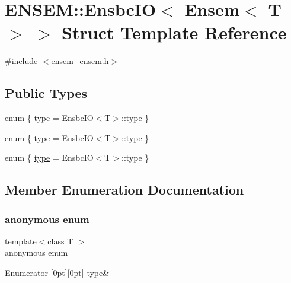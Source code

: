 \hypertarget{structENSEM_1_1EnsbcIO_3_01Ensem_3_01T_01_4_01_4}{}\section{E\+N\+S\+EM\+:\+:Ensbc\+IO$<$ Ensem$<$ T $>$ $>$ Struct Template Reference}
\label{structENSEM_1_1EnsbcIO_3_01Ensem_3_01T_01_4_01_4}


{\ttfamily \#include $<$ensem\+\_\+ensem.\+h$>$}

\subsection*{Public Types}
\begin{DoxyCompactItemize}
\item 
enum \{ \mbox{\hyperlink{structENSEM_1_1EnsbcIO_3_01Ensem_3_01T_01_4_01_4_a96e5c0cdf35d9f2fb39b4c54522912a7a69aac019e5c8434d1fa6bc1587dfec89}{type}} = Ensbc\+IO$<$T$>$\+:\+:type
 \}
\item 
enum \{ \mbox{\hyperlink{structENSEM_1_1EnsbcIO_3_01Ensem_3_01T_01_4_01_4_a96e5c0cdf35d9f2fb39b4c54522912a7a69aac019e5c8434d1fa6bc1587dfec89}{type}} = Ensbc\+IO$<$T$>$\+:\+:type
 \}
\item 
enum \{ \mbox{\hyperlink{structENSEM_1_1EnsbcIO_3_01Ensem_3_01T_01_4_01_4_a96e5c0cdf35d9f2fb39b4c54522912a7a69aac019e5c8434d1fa6bc1587dfec89}{type}} = Ensbc\+IO$<$T$>$\+:\+:type
 \}
\end{DoxyCompactItemize}


\subsection{Member Enumeration Documentation}
\mbox{\label{structENSEM_1_1EnsbcIO_3_01Ensem_3_01T_01_4_01_4_adf14e7314773c56b138fb1ba417a9696}} 
\subsubsection{\texorpdfstring{anonymous enum}{anonymous enum}}
{\footnotesize\ttfamily template$<$class T $>$ \\
anonymous enum}

\begin{DoxyEnumFields}{Enumerator}
[0pt][0pt]{}\mbox{\label{structENSEM_1_1EnsbcIO_3_01Ensem_3_01T_01_4_01_4_a96e5c0cdf35d9f2fb39b4c54522912a7a69aac019e5c8434d1fa6bc1587dfec89}} 
type&\\
\hline

\end{DoxyEnumFields}
\mbox{\label{structENSEM_1_1EnsbcIO_3_01Ensem_3_01T_01_4_01_4_ac4789ded6d044ac8640f0c3e7c7559be}} 
